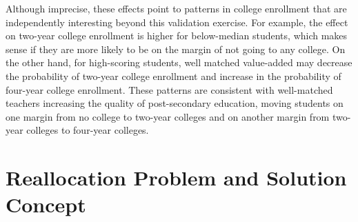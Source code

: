 \documentclass[12pt]{article}
\theoremstyle{definition}
\theoremstyle{definition}
\theoremstyle{definition}
\theoremstyle{definition}
\begin{document}
Although imprecise, these effects point to patterns in college enrollment that are independently interesting beyond this validation exercise. For example, the effect on two-year college enrollment is higher for below-median students, which makes sense if they are more likely to be on the margin of not going to any college. On the other hand, for high-scoring students, well matched value-added may decrease the probability of two-year college enrollment and increase in the probability of four-year college enrollment. These patterns are consistent with well-matched teachers increasing the quality of post-secondary education, moving students on one margin from no college to two-year colleges and on another margin from two-year colleges to four-year colleges.
    


\section{Reallocation Problem and Solution Concept} \label{optimization}


\end{document}
